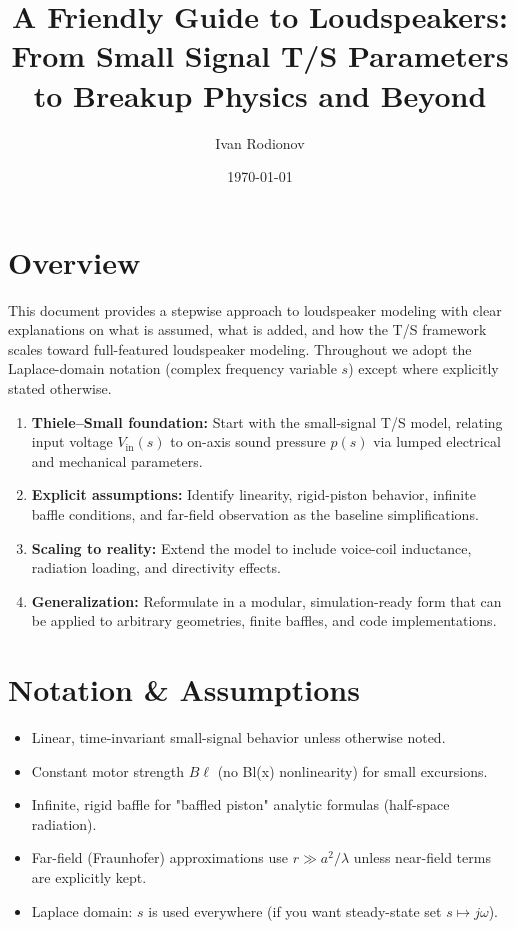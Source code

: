 \title{A Friendly Guide to Loudspeakers:\\
From Small Signal T/S Parameters to Breakup Physics and Beyond}
\date{\today}
\author{Ivan Rodionov}


\maketitle


\newpage
\section*{Overview}
This document provides a stepwise approach to loudspeaker modeling with clear explanations on what is assumed, what is added, and how the T/S framework scales toward full-featured loudspeaker modeling. Throughout we adopt the Laplace-domain notation (complex frequency variable $s$) except where explicitly stated otherwise.

\begin{enumerate}
    \item \textbf{Thiele--Small foundation:} Start with the small-signal T/S model, relating input voltage $V_{\mathrm{in}}(s)$ to on-axis sound pressure $p(s)$ via lumped electrical and mechanical parameters.  
    \item \textbf{Explicit assumptions:} Identify linearity, rigid-piston behavior, infinite baffle conditions, and far-field observation as the baseline simplifications.  
    \item \textbf{Scaling to reality:} Extend the model to include voice-coil inductance, radiation loading, and directivity effects.  
    \item \textbf{Generalization:} Reformulate in a modular, simulation-ready form that can be applied to arbitrary geometries, finite baffles, and code implementations.  
\end{enumerate}

\section*{Notation \& Assumptions}
\begin{itemize}
  \item Linear, time-invariant small-signal behavior unless otherwise noted.  
  \item Constant motor strength $B\ell$ (no Bl(x) nonlinearity) for small excursions.  
  \item Infinite, rigid baffle for "baffled piston" analytic formulas (half-space radiation).  
  \item Far-field (Fraunhofer) approximations use $r\gg a^2/\lambda$ unless near-field terms are explicitly kept.  
  \item Laplace domain: $s$ is used everywhere (if you want steady-state set $s\mapsto j\omega$).
\end{itemize}

